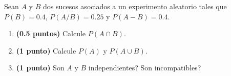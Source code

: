 
Sean $A$ y $B$ dos sucesos asociados a un experimento aleatorio tales que
$P(B)=0.4$, $P(A/B)=0.25$ y $P(A-B)=0.4$.
\begin{enumerate}[label=\alph*)]
  \item \textbf{(0.5 puntos)} Calcule $P(A\cap B)$.
  \item \textbf{(1 punto)} Calcule $P(A)$ y $P(A\cup B)$.
  \item \textbf{(1 punto)} \textquestiondown{}Son $A$ y $B$ independientes?
  \textquestiondown{}Son incompatibles?
\end{enumerate}
